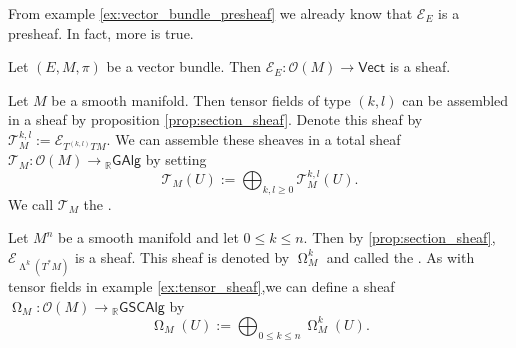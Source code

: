 From example \ref{ex:vector_bundle_presheaf} we already know that $\mathcal{E}_E$ is a presheaf. In fact, more is true.

\begin{proposition}
	\label{prop:section_sheaf}
	Let $(E,M,\pi)$ be a vector bundle. Then $\mathcal{E}_E : \mathcal{O}(M) \to \mathsf{Vect}$ is a sheaf. 
\end{proposition}

\begin{example}
	\label{ex:tensor_sheaf}
	Let $M$ be a smooth manifold. Then tensor fields of type $(k,l)$ can be assembled in a sheaf by proposition \ref{prop:section_sheaf}. Denote this sheaf by $\mathcal{T}^{k,l}_M := \mathcal{E}_{T^{(k,l)}TM}$. We can assemble these sheaves in a total sheaf $\mathcal{T}_M : \mathcal{O}(M) \to {_{\mathbb{R}}}\mathsf{GAlg}$ by setting
	\begin{equation*}
		\mathcal{T}_M(U) := \bigoplus_{k,l \geq 0} \mathcal{T}^{k,l}_M(U).
	\end{equation*}
	We call $\mathcal{T}_M$ the .
\end{example}

\begin{example}
	Let $M^n$ be a smooth manifold and let $0 \leq k \leq n$. Then by \ref{prop:section_sheaf}, $\mathcal{E}_{\upLambda^k(T^*M)}$ is a sheaf. This sheaf is denoted by $\upOmega^k_M$ and called the . As with tensor fields in example \ref{ex:tensor_sheaf},we can define a sheaf $\upOmega_M : \mathcal{O}(M) \to {_{\mathbb{R}}}\mathsf{GSCAlg}$ by
	\begin{equation*}
		\upOmega_M(U) := \bigoplus_{0 \leq k \leq n} \upOmega^k_M(U).
	\end{equation*}
\end{example}
